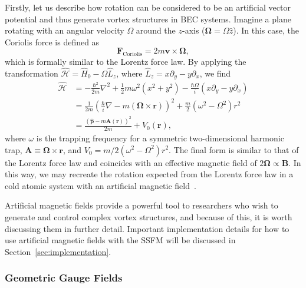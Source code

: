 Firstly, let us describe how rotation can be considered to be an artificial vector potential and thus generate vortex structures in BEC systems.
Imagine a plane rotating with an angular velocity $\Omega$ around the $z$-axis ($\mathbf{\Omega} = \Omega \hat z$). 
In this case, the Coriolis force is defined as
\begin{equation}
\mathbf{F}_{\text{Coriolis}} = 2m \mathbf{v} \times \mathbf{\Omega},
\end{equation}
which is formally similar to the Lorentz force law.
By applying the transformation $\mathcal{\hat H} = \hat H_0 - \Omega \hat L_z$, where $\hat L_z = x\partial_y - y\partial_x$, we find~\cite{bhat2008}
\begin{equation}
\begin{split}
\mathcal{\hat H} &= -\frac{\hbar^2}{2m}\nabla^2 + \frac 1 2 m \omega^2(x^2 + y^2) - \frac{\hbar \Omega}{i}(x\partial_y - y\partial_x) \\
 &= \frac{1}{2m}\left(\frac{\hbar}{i}\nabla - m(\mathbf{\Omega} \times \mathbf{r})\right)^2 + \frac m 2 \left( \omega^2 - \Omega^2 \right)r^2 \\
 &= \frac{(\hat{\mathbf{p}}-m\mathbf{A}(\mathbf{r}))^2}{2m}+ V_0(\mathbf{r}),
\end{split}
\end{equation}
where $\omega$ is the trapping frequency for a symmetric two-dimensional harmonic trap, $\mathbf{A} \equiv \mathbf{\Omega} \times \mathbf{r}$, and $V_0 = m/2 \left( \omega^2 - \Omega^2 \right)r^2$.
The final form is similar to that of the Lorentz force law and coincides with an effective magnetic field of $2 \mathbf \Omega \propto \mathbf B$.
In this way, we may recreate the rotation expected from the Lorentz force law in a cold atomic system with an artificial magnetic field~\cite{peshkin1989, madison2000, abo2001}.

Artificial magnetic fields provide a powerful tool to researchers who wish to generate and control complex vortex structures, and because of this, it is worth discussing them in further detail.
Important implementation details for how to use artificial magnetic fields with the SSFM will be discussed in Section~\ref{sec:implementation}.

\subsubsection{Geometric Gauge Fields}
\label{sec:geom}


